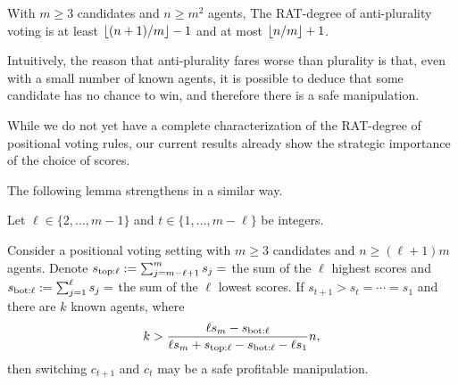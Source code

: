 \begin{theorem}
With $m\geq 3$ candidates and $n\geq m^2$ agents,
The RAT-degree of anti-plurality voting is 
at least $\left\lfloor (n+1)/m \right\rfloor-1$ and
at most $\left\lfloor n/m \right\rfloor+1$.
\end{theorem}
Intuitively, the reason that anti-plurality fares worse than plurality is that, even with a small number of known agents, it is possible to deduce that some candidate has no chance to win, and therefore there is a safe manipulation.

While we do not yet have a complete characterization of the RAT-degree of positional voting rules, our current results already show the strategic importance of the choice of scores.


\iffalse
The following lemma strengthens 
in a similar way.
\begin{lemma}
\label{lem:z:st1>st}
Let $\ell \in \{2,\ldots, m-1\}$ 
and $t\in\{1,\ldots,m-\ell \}$ be integers.

Consider a positional voting setting with $m\geq 3$ candidates and $n\geq (\ell+1)m$ agents.
Denote $s_{\mathrm{top:}\ell} := \sum_{j=m-\ell+1}^m s_j = $  the sum of the $\ell$ highest scores and $s_{\mathrm{bot:}\ell} := \sum_{j=1}^{\ell}s_j = $ the sum of the $\ell$ lowest scores.
If $s_{t+1} > s_t = \cdots = s_1$ and there are $k$ known agents,
where 
\begin{align*}
k > \frac{\ell s_m - s_{\mathrm{bot:}\ell}}{\ell s_m + s_{\mathrm{top:}\ell} - s_{\mathrm{bot:}\ell} - \ell s_1} n,
\end{align*}
then switching $c_{t+1}$ and $c_t$ may be a safe profitable manipulation.
\end{lemma}



